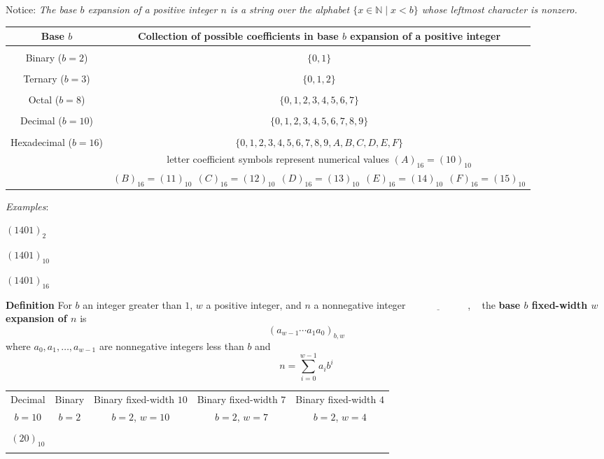 \documentclass[12pt, oneside]{article}
\newcommand{\st}{\mid}
\begin{document}
Notice: {\it The base $b$ expansion of a positive integer $n$ is a string over the alphabet 
$\{x \in \mathbb{N} \st x < b\}$
whose leftmost character is nonzero.}

\begin{center}
\begin{tabular}{|c|c|}
\hline
Base $b$ & Collection of possible coefficients in base $b$ expansion of  a positive integer \\
\hline
& \\
Binary ($b=2$) & $\{0,1\}$ \\
\hline
& \\
Ternary ($b=3$) & $\{0,1, 2\}$ \\
\hline
& \\
Octal ($b=8$) & $\{0,1, 2, 3, 4, 5, 6, 7\}$\\
\hline
& \\
Decimal ($b=10$) & $\{0,1, 2, 3, 4, 5, 6, 7, 8, 9\}$\\
\hline
& \\
Hexadecimal ($b=16$) &  $\{0,1, 2, 3, 4, 5, 6, 7, 8, 9, A, B, C, D, E, F\}$\\
& letter coefficient symbols represent numerical values $(A)_{16} = (10)_{10}$\\
&$(B)_{16} = (11)_{10} ~~(C)_{16} = (12)_{10} ~~
 (D)_{16} = (13)_{10} ~~ (E)_{16} = (14)_{10} ~~ (F)_{16} = (15)_{10} $\\
\hline
\end{tabular}
\end{center}

 \vfill
\newpage




{\it Examples}:

$(1401)_{2}$

\vfill

$(1401)_{10}$

\vfill
\vfill
\vfill


$(1401)_{16}$

\vfill
\vfill
\vfill
 

{\bf Definition} For $b$ an integer greater than $1$, $w$ a positive integer, 
and $n$ a nonnegative integer
$\underline{\phantom{\hspace{1in}}}$, ~
the {\bf base $b$ fixed-width $w$ expansion of $n$}  is
\[
(a_{w-1} \cdots a_1 a_0)_{b,w}
\]
where  $a_0, a_1, \ldots, a_{w-1}$ are nonnegative integers less than $b$ and
\[
n =  \sum_{i=0}^{w-1} a_{i} b^{i}
\]
 

\begin{center}
    \begin{tabular}{|c|c|c|c|c|}
    \hline
    Decimal &  Binary  & Binary fixed-width $10$& Binary fixed-width $7$ & Binary fixed-width $4$\\
    $b=10$ & $b=2$ & $b=2$, $w =  10$& $b=2$, $w =  7$& $b=2$, $w =  4$ \\
    \hline 
    &&&&  \\
    $(20)_{10}$&\phantom{$(10100)_{2}$\qquad\qquad}&&  &\\
    &&&&  \\
\hline
    \end{tabular}
    \end{center}
 \vfill
\newpage
\end{document}
